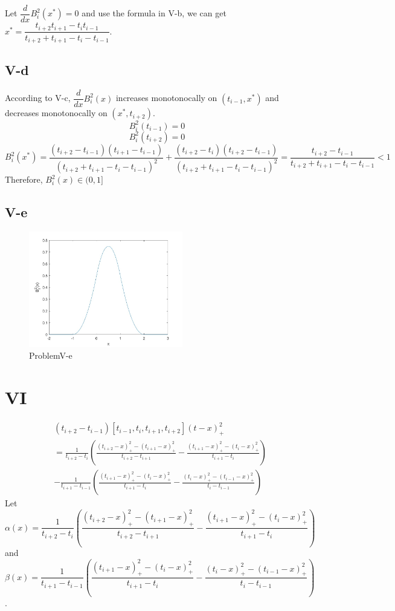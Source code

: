 \documentclass[a4paper]{article}
\begin{document}
Let $\dfrac{d}{dx}B_i^2(x^*) = 0$ and use the formula in V-b, we can get $x^* = \dfrac{t_{i+2}t_{i+1}-t_it_{i-1}}{t_{i+2}+t_{i+1}-t_i-t_{i-1}}$.

\subsection*{V-d}
According to V-c, $\dfrac{d}{dx}B_i^2(x)$ increases monotonocally on $(t_{i-1},x^*)$ and decreases monotonocally on $(x^*,t_{i+2})$.
$$
B_i^2(t_{i-1}) = 0
$$
$$
B_i^2(t_{i+2}) = 0
$$
$$
B_i^2(x^*) = \frac{(t_{i+2}-t_{i-1})(t_{i+1}-t_{i-1})}{(t_{i+2}+t_{i+1}-t_i-t_{i-1})^2}
+ \frac{(t_{i+2}-t_{i})(t_{i+2}-t_{i-1})}{(t_{i+2}+t_{i+1}-t_i-t_{i-1})^2}
= \frac{t_{i+2}-t_{i-1}}{t_{i+2}+t_{i+1}-t_i-t_{i-1}} < 1
$$
Therefore, $B_i^2(x) \in (0,1]$

\subsection*{V-e}
\begin{figure}[htbp]
  \centering
  \includegraphics[width=0.6\textwidth]{fig/ProblemV-e.jpg}
  \caption{ProblemV-e}
  \label{fig:ProblemV-e}
\end{figure}

\section*{VI}
\begin{align*}
& (t_{i+2} - t_{i-1})[t_{i-1}, t_i, t_{i+1}, t_{i+2}](t - x)_+^2 \\
&= \frac{1}{t_{i+2} - t_i}(\frac{(t_{i+2} - x)_+^2 - (t_{i+1} - x)_+^2}{t_{i+2} - t_{i+1}} - \frac{(t_{i+1} - x)_+^2 - (t_{i} - x)_+^2}{t_{i+1} - t_{i}}) \\
&- \frac{1}{t_{i+1} - t_{i-1}}(\frac{(t_{i+1} - x)_+^2 - (t_{i} - x)_+^2}{t_{i+1} - t_{i}} - \frac{(t_{i} - x)_+^2 - (t_{i-1} - x)_+^2}{t_{i} - t_{i-1}})
\end{align*}
Let $\alpha(x) = \dfrac{1}{t_{i+2} - t_i}(\dfrac{(t_{i+2} - x)_+^2 - (t_{i+1} - x)_+^2}{t_{i+2} - t_{i+1}} - \dfrac{(t_{i+1} - x)_+^2 - (t_{i} - x)_+^2}{t_{i+1} - t_{i}})$ and 
$\beta(x) = \dfrac{1}{t_{i+1} - t_{i-1}}(\dfrac{(t_{i+1} - x)_+^2 - (t_{i} - x)_+^2}{t_{i+1} - t_{i}} - \dfrac{(t_{i} - x)_+^2 - (t_{i-1} - x)_+^2}{t_{i} - t_{i-1}})$.
\end{document}
